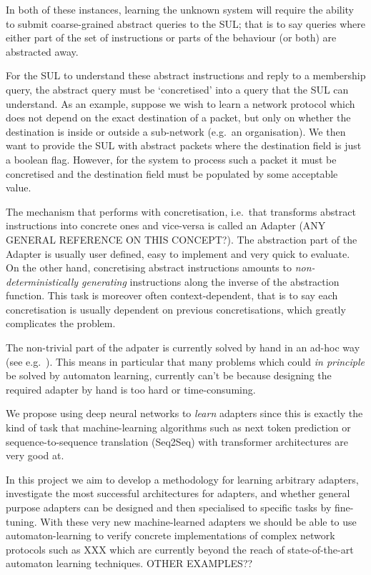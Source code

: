 \documentclass[11pt,a4paper]{article}
\begin{document}
		In both of these instances, learning the unknown system will require the ability to submit coarse-grained abstract queries to the SUL; that is to say queries where either part of the set of instructions or parts of the behaviour (or both) are abstracted away. 
		
		For the SUL to understand these abstract instructions and reply to a membership query, the abstract query must be `concretised' into a query that the SUL can understand.  As an example, suppose we wish to learn a network protocol which does not depend on the exact destination of a packet, but only on whether the destination is inside or outside a sub-network (e.g.\ an organisation). We then want to provide the SUL with abstract packets where the destination field is just a boolean flag. However, for the system to process such a packet it must be concretised and the destination field must be populated by some acceptable value.
		
		The mechanism that performs with concretisation, i.e.\ that transforms abstract instructions into concrete ones and vice-versa is called an Adapter \cite{ferreira2021prognosis} (ANY GENERAL REFERENCE ON THIS CONCEPT?). The abstraction part of the Adapter is usually user defined, easy to implement and very quick to evaluate. On the other hand, concretising abstract instructions amounts to \emph{non-deterministically generating} instructions along the inverse of the abstraction function. This task is moreover often context-dependent, that is to say each concretisation is usually dependent on previous concretisations, which greatly complicates the problem. 
		
		The non-trivial part of the adpater is currently solved by hand in an ad-hoc way (see e.g.\ \cite{ferreira2021prognosis}). This means in particular that many problems which could \emph{in principle} be solved by automaton learning, currently can't be because designing the required adapter by hand is too hard or time-consuming.
		
		We propose using deep neural networks to \emph{learn} adapters since this is exactly the kind of task that machine-learning algorithms such as next token prediction or sequence-to-sequence translation (Seq2Seq) with transformer architectures are very good at. 
		
		In this project we aim to develop a methodology for learning arbitrary adapters, investigate the most successful architectures for adapters, and whether general purpose adapters can be designed and then specialised to specific tasks by fine-tuning. With these very new machine-learned adapters we should be able to use automaton-learning to verify concrete implementations of complex network protocols such as XXX which are currently beyond the reach of state-of-the-art automaton learning techniques. OTHER EXAMPLES??
		
\end{document}
